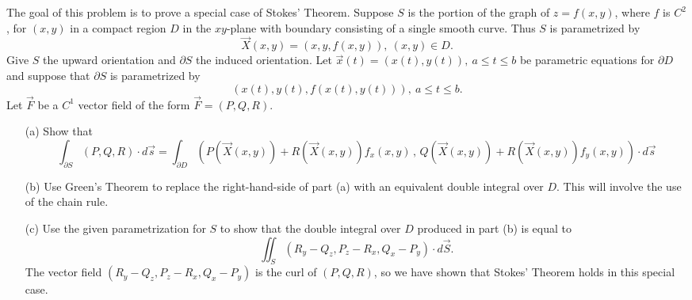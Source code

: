 \documentclass[11pt,letterpaper,cm]{nupset}
\begin{document}
\begin{problem}[Exercise 6] The goal of this problem is to prove a special case of Stokes' Theorem. Suppose $S$ is the portion of the graph of $z=f(x,y)$, where $f$ is $C^2$, for $(x,y)$ in a compact region $D$ in the $xy$-plane with boundary consisting of a single smooth curve. Thus $S$ is parametrized by
	$$\vec{X}(x,y) = (x,y,f(x,y)),\ (x,y) \in D.$$
	Give $S$ the upward orientation and $\partial S$ the induced orientation. Let $\vec{x}(t) = (x(t),y(t)),\ a \le t \le b$ be parametric equations for $\partial D$ and suppose that $\partial S$ is parametrized by
	$$(x(t),y(t),f(x(t),y(t))),\ a \le t \le b.$$
	Let $\vec{F}$ be a $C^1$ vector field of the form $\vec{F} = (P,Q,R)$.
	\begin{itemize}
		\item[(a)] Show that $$\displaystyle\int_{\partial S} (P,Q,R) \cdot d\vec{s}= \int_{\partial D} (P(\vec{X}(x,y))+R(\vec{X}(x,y))f_x(x,y)\,,\, Q(\vec{X}(x,y))+R(\vec{X}(x,y))f_y(x,y))\cdot d\vec{s}$$
		\item[(b)] Use Green's Theorem to replace the right-hand-side of part (a) with an equivalent double integral over $D$. This will involve the use of the chain rule.
		\item[(c)] Use the given parametrization for $S$ to show that the double integral over $D$ produced in part (b) is equal to $$\iint_S (R_y-Q_z,P_z-R_x,Q_x-P_y)\cdot d\vec{S}.$$
		The vector field $(R_y-Q_z,P_z-R_x,Q_x-P_y)$ is the curl of $(P,Q,R)$, so we have shown that Stokes' Theorem holds in this special case.
	\end{itemize}
\end{problem}
\end{document}
